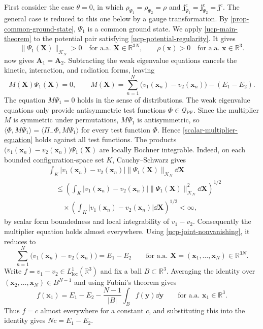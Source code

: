 \documentclass[final,reqno]{amsart}
\theoremstyle{remark}
\newcommand{\RR}{\mathbb{R}}
\newcommand{\dua}[2]{\langle #1, #2 \rangle}
\newcommand{\vjc}{\mathbf{j}^{\mathrm{c}}}
\newcommand{\PF}{\mathrm{PF}}
\newcommand{\vy}{\mathbf{y}}
\newcommand{\vx}{\mathbf{x}}
\newcommand{\vA}{{\mathbf{A}}}
\newcommand{\vX}{{\mathbf{X}}}
\begin{document}
First consider the case $\theta=0$, in which
$\rho_{\Psi_1}=\rho_{\Psi_2}=\rho$ and $\vjc_{\Psi_1}=\vjc_{\Psi_2}=\vjc$.  The
general case is reduced to this one below by a gauge transformation.  By \cref{prop-common-ground-state},
$\Psi_1$ is a common ground state.
We apply \cref{ucp-main-theorem} to the potential pair satisfying
\cref{ucp-potential-regularity}.  It gives
\begin{equation}\label{ucp-joint-nonvanishing}
 \|\Psi_1(\vX)\|_{\mathcal K_N}>0
 \quad\text{for a.a. }\vX\in\RR^{3N},\qquad
 \rho(\vx)>0\quad\text{for a.a. }\vx\in\RR^3.
\end{equation}
 now gives $\vA_1=\vA_2$.
Subtracting the weak eigenvalue equations cancels the kinetic,
interaction, and radiation forms, leaving
\begin{equation}\label{scalar-multiplier-equation}
 M(\vX)\Psi_1(\vX)=0,\qquad
 M(\vX)=\sum_{n=1}^N\big(v_1(\vx_n)-v_2(\vx_n)\big)-(E_1-E_2).
\end{equation}
The equation $M\Psi_1=0$ holds in the sense of distributions.  The weak eigenvalue equations only
provide antisymmetric test functions $\Phi\in\mathcal Q_\PF$.  Since the
multiplier $M$ is symmetric under permutations, $M\Psi_1$ is antisymmetric, so
$\dua{\Phi}{M\Psi_1}=\dua{\Pi_-\Phi}{M\Psi_1}$ for every test function
$\Phi$.  Hence \cref{scalar-multiplier-equation} holds against all test
functions.  The products
$\big(v_1(\vx_n)-v_2(\vx_n)\big)\Psi_1(\vX)$ are locally Bochner integrable.  Indeed, on each
bounded configuration-space set $K$, Cauchy--Schwarz gives
\[
 \begin{aligned}
 &\int_K |v_1(\vx_n)-v_2(\vx_n)|\|\Psi_1(\vX)\|_{\mathcal K_N}\dd\vX\\
 &\quad\leq\left(\int_K|v_1(\vx_n)-v_2(\vx_n)|\|\Psi_1(\vX)\|_{\mathcal K_N}^2\dd\vX\right)^{1/2}\\
 &\qquad\times\left(\int_K|v_1(\vx_n)-v_2(\vx_n)|\dd\vX\right)^{1/2}<\infty,
 \end{aligned}
\]
by scalar form boundedness and local integrability of $v_1-v_2$.
Consequently the multiplier equation holds almost everywhere.
Using \cref{ucp-joint-nonvanishing}, it reduces to
\[
 \sum_{n=1}^N \big(v_1(\vx_n)-v_2(\vx_n)\big)=E_1-E_2
 \qquad\text{for a.a. }\vX=(\vx_1,\ldots,\vx_N)\in\RR^{3N}.
\]
Write $f=v_1-v_2\in L^1_\mathrm{loc}(\RR^3)$ and fix a ball $B\subset\RR^3$.
Averaging the identity over $(\vx_2,\ldots,\vx_N)\in B^{N-1}$ and using
Fubini's theorem gives
\[
 f(\vx_1)=E_1-E_2-\frac{N-1}{|B|}\int_B f(\vy)\dd\vy
 \qquad\text{for a.a. }\vx_1\in\RR^3.
\]
Thus $f=c$ almost everywhere for a constant $c$, and substituting this
into the identity gives $Nc=E_1-E_2$.
\end{document}
